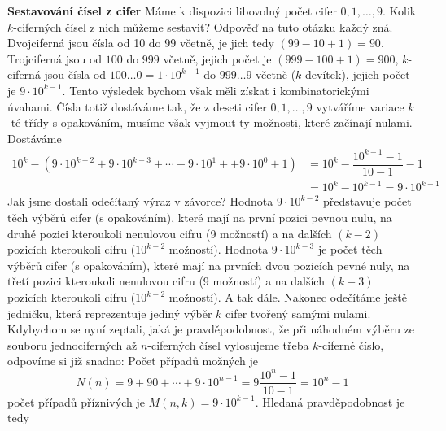 \wikitextrule
\begin{example}\label{mai:exam054}
  \textbf{Sestavování čísel z cifer}\newline\small
   Máme k dispozici libovolný počet cifer \(0, 1, \ldots, 9\). Kolik \(k\)-ciferných čísel z nich 
   můžeme sestavit? Odpověď na tuto otázku každý zná. Dvojciferná jsou čísla od \num{10} do 
   \num{99} včetně, je jich tedy \((99 - 10 + 1) = 90\). Trojciferná jsou od \(100\) do \(999\) 
   včetně, jejich počet je \((999 - 100 + 1) = 900\), \(k\)-ciferná jsou čísla od \(100\ldots0 = 
   1\cdot10^{k-1}\) do \(999\ldots9\) včetně (\(k\) devítek), jejich počet je \(9\cdot10^{k-1}\). 
   Tento výsledek bychom však měli získat i kombinatorickými úvahami. Čísla totiž dostáváme tak, že 
   z deseti cifer \(0, 1,\ldots, 9\) vytváříme variace \(k\)-té třídy s opakováním, musíme však 
   vyjmout ty možnosti, které začínají nulami. Dostáváme
   \begin{align*}
     10^k - 
       \left(
         9\cdot10^{k-2} + 9\cdot10^{k-3} + \cdots + 9\cdot10^1 + + 9\cdot10^0 + 1 
       \right)
        &= 10^k - \dfrac{10^{k-1} - 1}{10 - 1} - 1     \\
        &= 10^k - 10^{k-1} = 9\cdot10^{k-1}
   \end{align*}
   Jak jsme dostali odečítaný výraz v závorce? Hodnota \(9\cdot10^{k-2}\) představuje počet těch 
   výběrů cifer (s opakováním), které mají na první pozici pevnou nulu, na druhé pozici kteroukoli 
   nenulovou cifru (\num{9} možností) a na dalších \((k - 2)\) pozicích kteroukoli cifru 
   (\(10^{k-2}\) možností). Hodnota \(9\cdot10^{k-3}\) je počet těch výběrů cifer (s opakováním), 
   které mají na prvních dvou pozicích pevné nuly, na třetí pozici kteroukoli nenulovou cifru 
   (\num{9} možností) a na dalších \((k - 3)\) pozicích kteroukoli cifru (\(10^{k-2}\) možností). A 
   tak dále. Nakonec odečítáme ještě jedničku, která reprezentuje jediný výběr \(k\) cifer tvořený 
   samými nulami. Kdybychom se nyní zeptali, jaká je pravděpodobnost, že při náhodném výběru ze 
   souboru jednociferných až \(n\)-ciferných čísel vylosujeme třeba \(k\)-ciferné číslo, odpovíme 
   si již snadno: Počet případů možných je
   \begin{equation*}
     N(n) =9 + 90 + \cdots + 9\cdot10^{n-1} = 9\dfrac{10^n-1}{10 - 1} = 10^n - 1
   \end{equation*}
   počet případů příznivých je  \(M(n,k) = 9\cdot10^{k-1}\). Hledaná pravděpodobnost je tedy
   \begin{equation*}

\end{equation*}
\end{example}
